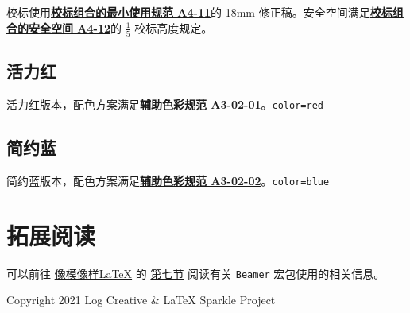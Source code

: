 \documentclass[a4paper,12pt]{article}
\begin{document}
\begin{CJK}{UTF8}{song}
校标使用\href{http://vi.sjtu.edu.cn/index.php/articles/base/4}{\textbf{校标组合的最小使用规范 A4-11}}的 18mm
 修正稿。安全空间满足\href{http://vi.sjtu.edu.cn/index.php/articles/base/4}{\textbf{校标组合的安全空间 A4-12}}的 $\frac{1}{5}$ 校标高度规定。

\subsection{活力红}

活力红版本，配色方案满足\href{http://vi.sjtu.edu.cn/index.php/articles/base/3}{\textbf{辅助色彩规范 A3-02-01}}。\hfill\texttt{color=red}

\begin{tcbraster}[raster columns=3,colframe=red,colback=white,
    colbacktitle=red!50!white,fonttitle=\small\bfseries\ttfamily,
    left=0pt,right=0pt,top=0pt,bottom=0pt,boxsep=0pt,boxrule=0.6pt,
    toptitle=1mm,bottomtitle=1mm,drop lifted shadow,center title,
    graphics pages={1,...,9}]
\end{tcbraster}

\newpage
\subsection{简约蓝}

简约蓝版本，配色方案满足\href{http://vi.sjtu.edu.cn/index.php/articles/base/3}{\textbf{辅助色彩规范 A3-02-02}}。\hfill \texttt{color=blue}

\begin{tcbraster}[raster columns=3,colframe=blue,colback=white,
    colbacktitle=blue!50!white,fonttitle=\small\bfseries\ttfamily,
    left=0pt,right=0pt,top=0pt,bottom=0pt,boxsep=0pt,boxrule=0.6pt,
    toptitle=1mm,bottomtitle=1mm,drop lifted shadow,center title,
    graphics pages={1,...,9}]
\end{tcbraster}

\section{拓展阅读}
可以前往 \href{https://logcreative.github.io/LaTeXSparkle/}{像模像样\LaTeX} 的 \href{https://logcreative.github.io/LaTeXSparkle/src/art/chapter07.html}{第七节} 阅读有关 \verb"Beamer" 宏包使用的相关信息。

\scriptsize  

\newpage
Copyright 2021 Log Creative \& \LaTeX{} Sparkle Project


\end{CJK}
\end{document}
